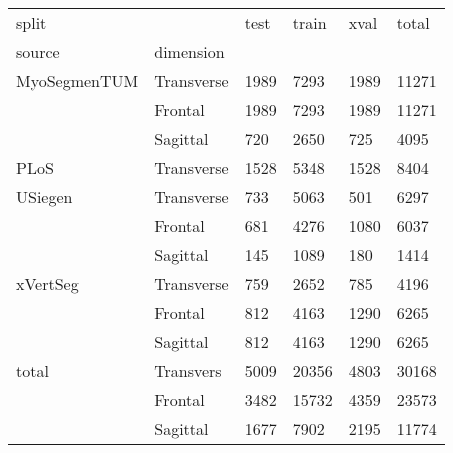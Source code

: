 \begin{tabular}{ll|lll|l}
    \toprule
    split        &            & test & train & xval & total \\
    source       & dimension  &      &       &      &       \\ \hline
    MyoSegmenTUM & Transverse & 1989 & 7293  & 1989 & 11271 \\
                 & Frontal    & 1989 & 7293  & 1989 & 11271 \\
                 & Sagittal   & 720  & 2650  & 725  & 4095  \\
    PLoS         & Transverse & 1528 & 5348  & 1528 & 8404  \\
    USiegen      & Transverse & 733  & 5063  & 501  & 6297  \\
                 & Frontal    & 681  & 4276  & 1080 & 6037  \\
                 & Sagittal   & 145  & 1089  & 180  & 1414  \\
    xVertSeg     & Transverse & 759  & 2652  & 785  & 4196  \\
                 & Frontal    & 812  & 4163  & 1290 & 6265  \\
                 & Sagittal   & 812  & 4163  & 1290 & 6265  \\ \hline
    total        & Transvers  & 5009 & 20356 & 4803 & 30168 \\
                 & Frontal    & 3482 & 15732 & 4359 & 23573 \\
                 & Sagittal   & 1677 & 7902  & 2195 & 11774 \\ \bottomrule
    \end{tabular}